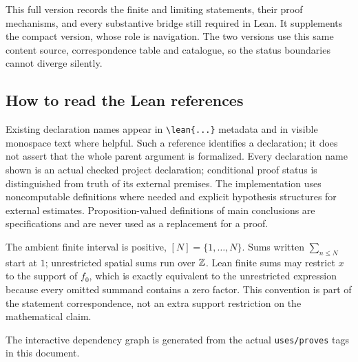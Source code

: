 \ifDetailed
This full version records the finite and limiting statements, their proof mechanisms, and every substantive bridge still required in Lean. It supplements the compact version, whose role is navigation. The two versions use this same content source, correspondence table and catalogue, so the status boundaries cannot diverge silently.

\subsection*{How to read the Lean references}
Existing declaration names appear in \verb|\lean{...}| metadata and in visible monospace text where helpful. Such a reference identifies a declaration; it does not assert that the whole parent argument is formalized. Every declaration name shown is an actual checked project declaration; conditional proof status is distinguished from truth of its external premises. The implementation uses noncomputable definitions where needed and explicit hypothesis structures for external estimates. Proposition-valued definitions of main conclusions are specifications and are never used as a replacement for a proof.

The ambient finite interval is positive, $[N]=\{1,\ldots,N\}$. Sums written $\sum_{n\leq N}$ start at $1$; unrestricted spatial sums run over $\mathbb Z$. Lean finite sums may restrict $x$ to the support of $f_0$, which is exactly equivalent to the unrestricted expression because every omitted summand contains a zero factor. This convention is part of the statement correspondence, not an extra support restriction on the mathematical claim.
\fi

\ifdefined\WebVersion
The interactive dependency graph is generated from the actual \texttt{uses/proves} tags in this document.\else\fi

